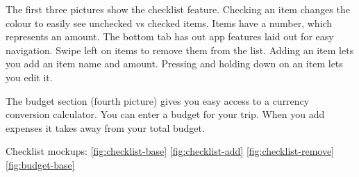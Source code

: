 \documentclass[12pt]{article}
\begin{document}
    The first three pictures show the checklist feature.
	Checking an item changes the colour to easily see unchecked vs checked items.
    Items have a number, which represents an amount.
    The bottom tab has out app features laid out for easy navigation.
    Swipe left on items to remove them from the list.
    Adding an item lets you add an item name and amount.
    Pressing and holding down on an item lets you edit it.

    The budget section (fourth picture) gives you easy access to a currency conversion calculator.
    You can enter a budget for your trip.
    When you add expenses it takes away from your total budget.



	Checklist mockups: \ref{fig:checklist-base} \ref{fig:checklist-add} \ref{fig:checklist-remove} \ref{fig:budget-base}
\end{document}
